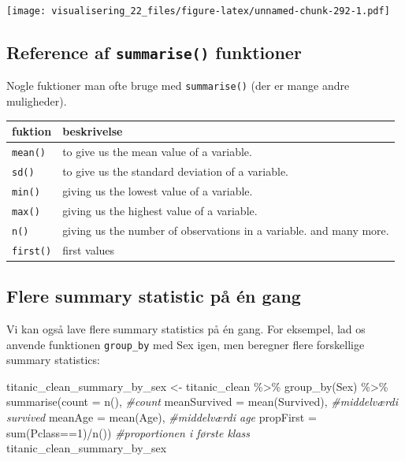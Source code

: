 \documentclass[
]{book}
\newenvironment{Shaded}{\begin{snugshade}}{\end{snugshade}}
\newcommand{\AttributeTok}[1]{\textcolor[rgb]{0.77,0.63,0.00}{#1}}
\newcommand{\CommentTok}[1]{\textcolor[rgb]{0.56,0.35,0.01}{\textit{#1}}}
\newcommand{\DecValTok}[1]{\textcolor[rgb]{0.00,0.00,0.81}{#1}}
\newcommand{\FunctionTok}[1]{\textcolor[rgb]{0.00,0.00,0.00}{#1}}
\newcommand{\NormalTok}[1]{#1}
\newcommand{\OtherTok}[1]{\textcolor[rgb]{0.56,0.35,0.01}{#1}}
\newcommand{\SpecialCharTok}[1]{\textcolor[rgb]{0.00,0.00,0.00}{#1}}
\begin{document}
\texttt{[image: visualisering\_22\_files/figure-latex/unnamed-chunk-292-1.pdf]}

\hypertarget{reference-af-summarise-funktioner}{%
\subsection{\texorpdfstring{Reference af \texttt{summarise()} funktioner}{Reference af summarise() funktioner}}\label{reference-af-summarise-funktioner}}

Nogle fuktioner man ofte bruge med \texttt{summarise()} (der er mange andre muligheder).

\begin{longtable}[]{@{}ll@{}}
\toprule
fuktion & beskrivelse \\
\midrule
\endhead
\texttt{mean()} & to give us the mean value of a variable. \\
\texttt{sd()} & to give us the standard deviation of a variable. \\
\texttt{min()} & giving us the lowest value of a variable. \\
\texttt{max()} & giving us the highest value of a variable. \\
\texttt{n()} & giving us the number of observations in a variable. and many more. \\
\texttt{first()} & first values \\
\bottomrule
\end{longtable}

\hypertarget{flere-summary-statistic-puxe5-uxe9n-gang}{%
\subsection{Flere summary statistic på én gang}\label{flere-summary-statistic-puxe5-uxe9n-gang}}

Vi kan også lave flere summary statistics på én gang. For eksempel, lad os anvende funktionen \texttt{group\_by} med Sex igen, men beregner flere forskellige summary statistics:

\begin{Shaded}
\begin{Highlighting}[]
\NormalTok{titanic\_clean\_summary\_by\_sex }\OtherTok{\textless{}{-}}\NormalTok{ titanic\_clean }\SpecialCharTok{\%\textgreater{}\%}  
  \FunctionTok{group\_by}\NormalTok{(Sex) }\SpecialCharTok{\%\textgreater{}\%} 
  \FunctionTok{summarise}\NormalTok{(}\AttributeTok{count =} \FunctionTok{n}\NormalTok{(),                    }\CommentTok{\#count}
            \AttributeTok{meanSurvived =} \FunctionTok{mean}\NormalTok{(Survived),  }\CommentTok{\#middelværdi survived}
            \AttributeTok{meanAge =} \FunctionTok{mean}\NormalTok{(Age),            }\CommentTok{\#middelværdi age}
            \AttributeTok{propFirst =} \FunctionTok{sum}\NormalTok{(Pclass}\SpecialCharTok{==}\DecValTok{1}\NormalTok{)}\SpecialCharTok{/}\FunctionTok{n}\NormalTok{()) }\CommentTok{\#proportionen i første klass}
\NormalTok{titanic\_clean\_summary\_by\_sex}
\end{Highlighting}
\end{Shaded}
\end{document}
